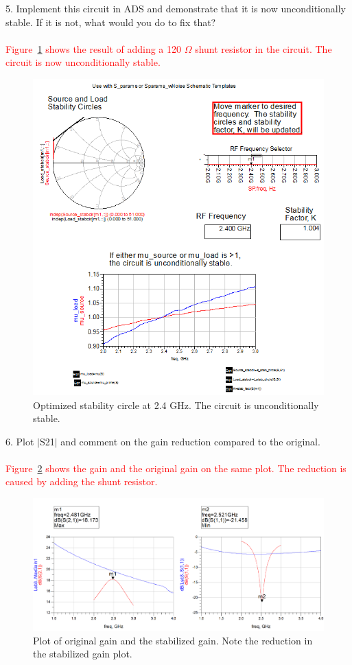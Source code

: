 \documentclass[conference]{IEEEtran}
\begin{document}
5. Implement this circuit in ADS and demonstrate that it is now unconditionally stable. If it is not, what would you do to fix that?\\\\
\textcolor{red}{Figure~\ref{fig:stabcircle-optimized} shows the result of adding a 120 $\Omega$ shunt resistor in the circuit.  The circuit is now unconditionally stable.}
\begin{figure}[!h]
\centering
\includegraphics[scale=0.55]{pic/stabcircle-optimized.png}
\caption{Optimized stability circle at 2.4 GHz.  The circuit is unconditionally stable.}
\label{fig:stabcircle-optimized}
\end{figure}

6. Plot $|$S21$|$ and comment on the gain reduction compared to the original.\\\\
\textcolor{red}{Figure~\ref{fig:lastproblem} shows the gain and the original gain on the same plot.  The reduction is caused by adding the shunt resistor.}
\begin{figure}[!h]
\centering
\includegraphics[scale=0.2]{pic/lastproblem.png}
\caption{Plot of original gain and the stabilized gain.  Note the reduction in the stabilized gain plot.}
\label{fig:lastproblem}
\end{figure}
\newpage
\end{document}
